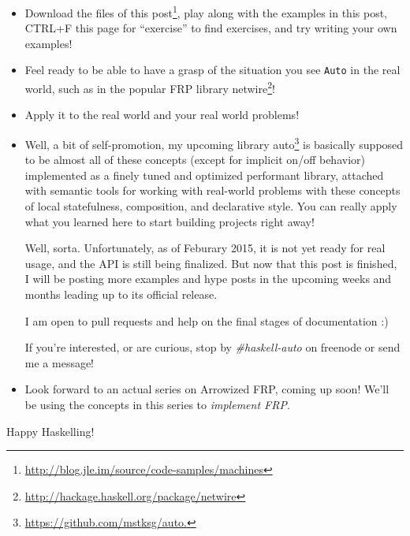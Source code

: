 \documentclass[]{article}
\renewcommand{\href}[2]{#2\footnote{\url{#1}}}
\begin{document}
\begin{itemize}
\item
  \href{http://blog.jle.im/source/code-samples/machines}{Download the
  files of this post}, play along with the examples in this post, CTRL+F
  this page for ``exercise'' to find exercises, and try writing your own
  examples!
\item
  Feel ready to be able to have a grasp of the situation you see
  \texttt{Auto} in the real world, such as in the popular FRP library
  \href{http://hackage.haskell.org/package/netwire}{netwire}!
\item
  Apply it to the real world and your real world problems!
\item
  Well, a bit of self-promotion, my upcoming library
  \href{https://github.com/mstksg/auto.}{auto} is basically supposed to
  be almost all of these concepts (except for implicit on/off behavior)
  implemented as a finely tuned and optimized performant library,
  attached with semantic tools for working with real-world problems with
  these concepts of local statefulness, composition, and declarative
  style. You can really apply what you learned here to start building
  projects right away!

  Well, sorta. Unfortunately, as of Feburary 2015, it is not yet ready
  for real usage, and the API is still being finalized. But now that
  this post is finished, I will be posting more examples and hype posts
  in the upcoming weeks and months leading up to its official release.

  I am open to pull requests and help on the final stages of
  documentation :)

  If you're interested, or are curious, stop by \emph{\#haskell-auto} on
  freenode or send me a message!
\item
  Look forward to an actual series on Arrowized FRP, coming up soon!
  We'll be using the concepts in this series to \emph{implement FRP}.
\end{itemize}

Happy Haskelling!
\end{document}
